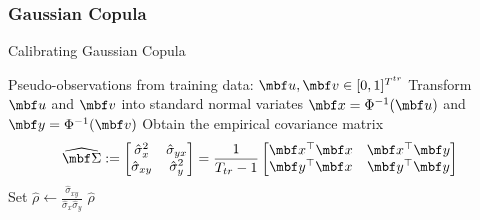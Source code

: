 \documentclass[12pt,a4paper]{article}
\begin{document}



\subsubsection{Gaussian Copula}

\begin{algorithm}[H]
\label{alg:calibrating_gaussian}
\caption{Calibrating Gaussian Copula}
\begin{algorithmic}[1]
\Require Pseudo-observations from training data: $\mbf u,\mbf v\in [0,1]^{T^{tr}}$
\State Transform $\mbf u$ and $\mbf v$ into standard normal variates $\mbf x=\Phi^{-1}(\mbf u)$ and $\mbf y=\Phi^{-1}(\mbf v)$%
\State Obtain the empirical covariance matrix 
$$
\widehat{\mbf \Sigma} 
:=\begin{bmatrix} 
			\hat \sigma_{x}^2 & \hat \sigma_{yx} \\
			\hat \sigma_{xy} & \hat \sigma_{y}^2
		\end{bmatrix}
= \frac{1}{T_{tr}-1}\begin{bmatrix} \mbf x^\top\mbf x & \mbf x^\top\mbf y \\ \mbf y^\top\mbf x & \mbf y^\top\mbf y \end{bmatrix}$$
\State Set $\displaystyle \hat \rho \gets \frac{\hat \sigma_{xy}}{\hat \sigma_x \hat \sigma_y}$
\Ensure $\hat \rho$
\end{algorithmic}
\end{algorithm}
\end{document}
